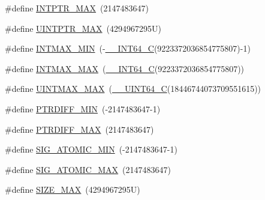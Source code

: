 \begin{DoxyCompactItemize}
\item 
\#define \hyperlink{win_2_l_a_d_s_p_a__plugins-win_2glibc__includes_2stdint_8h_a9e5742f2bae4a5283431a3c03499e3a9}{I\+N\+T\+P\+T\+R\+\_\+\+M\+AX}~(2147483647)
\item 
\#define \hyperlink{win_2_l_a_d_s_p_a__plugins-win_2glibc__includes_2stdint_8h_ab2355300ea19395357e62d780f4dd073}{U\+I\+N\+T\+P\+T\+R\+\_\+\+M\+AX}~(4294967295\+U)
\item 
\#define \hyperlink{win_2_l_a_d_s_p_a__plugins-win_2glibc__includes_2stdint_8h_a2b0a3edfc672154f606dc3ad26277b61}{I\+N\+T\+M\+A\+X\+\_\+\+M\+IN}~(-\/\hyperlink{win_2_l_a_d_s_p_a__plugins-win_2glibc__includes_2stdint_8h_a4b8971e411b88166747d2a3c2425eaee}{\+\_\+\+\_\+\+I\+N\+T64\+\_\+C}(9223372036854775807)-\/1)
\item 
\#define \hyperlink{win_2_l_a_d_s_p_a__plugins-win_2glibc__includes_2stdint_8h_a022b9b0a3564d786244a4631847c37a3}{I\+N\+T\+M\+A\+X\+\_\+\+M\+AX}~(\hyperlink{win_2_l_a_d_s_p_a__plugins-win_2glibc__includes_2stdint_8h_a4b8971e411b88166747d2a3c2425eaee}{\+\_\+\+\_\+\+I\+N\+T64\+\_\+C}(9223372036854775807))
\item 
\#define \hyperlink{win_2_l_a_d_s_p_a__plugins-win_2glibc__includes_2stdint_8h_aa54fd5210434219e9027bfa0f0e325c8}{U\+I\+N\+T\+M\+A\+X\+\_\+\+M\+AX}~(\hyperlink{win_2_l_a_d_s_p_a__plugins-win_2glibc__includes_2stdint_8h_a405cee4934ed56c9a4aa4e7dc4380bd2}{\+\_\+\+\_\+\+U\+I\+N\+T64\+\_\+C}(18446744073709551615))
\item 
\#define \hyperlink{win_2_l_a_d_s_p_a__plugins-win_2glibc__includes_2stdint_8h_ad9b88ba2fb858f98b50b38e49875d90e}{P\+T\+R\+D\+I\+F\+F\+\_\+\+M\+IN}~(-\/2147483647-\/1)
\item 
\#define \hyperlink{win_2_l_a_d_s_p_a__plugins-win_2glibc__includes_2stdint_8h_add2ef7bffac19cfdd1f4b5495409672f}{P\+T\+R\+D\+I\+F\+F\+\_\+\+M\+AX}~(2147483647)
\item 
\#define \hyperlink{win_2_l_a_d_s_p_a__plugins-win_2glibc__includes_2stdint_8h_a21e605b9ac3a03b6de93cdf5a69e129f}{S\+I\+G\+\_\+\+A\+T\+O\+M\+I\+C\+\_\+\+M\+IN}~(-\/2147483647-\/1)
\item 
\#define \hyperlink{win_2_l_a_d_s_p_a__plugins-win_2glibc__includes_2stdint_8h_a1f5fe9445d0ad0bee21bab1de4cc3e58}{S\+I\+G\+\_\+\+A\+T\+O\+M\+I\+C\+\_\+\+M\+AX}~(2147483647)
\item 
\#define \hyperlink{win_2_l_a_d_s_p_a__plugins-win_2glibc__includes_2stdint_8h_a3c75bb398badb69c7577b21486f9963f}{S\+I\+Z\+E\+\_\+\+M\+AX}~(4294967295\+U)
\item 

\end{DoxyCompactItemize}
